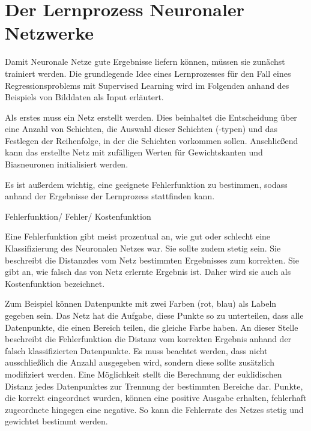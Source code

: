\section{Der Lernprozess Neuronaler Netzwerke}
\label{section: Lernprozess}
Damit Neuronale Netze gute Ergebnisse liefern können, müssen sie zunächst trainiert werden. Die grundlegende Idee eines Lernprozesses für den Fall eines Regressionsproblems mit Supervised Learning wird im Folgenden anhand des Beispiels von Bilddaten als Input erläutert. 

Als erstes muss ein Netz erstellt werden. Dies beinhaltet die Entscheidung über eine Anzahl von Schichten, die Auswahl dieser Schichten (-typen) und das Festlegen der Reihenfolge, in der die Schichten vorkommen sollen. Anschließend kann das erstellte Netz mit zufälligen Werten für Gewichtskanten und Biasneuronen initialisiert werden. \cite{} 

Es ist außerdem wichtig, eine geeignete Fehlerfunktion zu bestimmen, sodass anhand der Ergebnisse der Lernprozess stattfinden kann. 

\begin{definition}
	Fehlerfunktion/ Fehler/ Kostenfunktion
	
	Eine Fehlerfunktion gibt meist prozentual an, wie gut oder schlecht eine Klassifizierung des Neuronalen Netzes war. Sie sollte zudem stetig sein. \cite{}  Sie beschreibt die \glqq Distanz\grqq des vom Netz bestimmten Ergebnisses zum korrekten. Sie gibt an, wie falsch das von Netz erlernte Ergebnis ist. Daher wird sie auch als Kostenfunktion bezeichnet. \cite{Basics Kostenfunktion}
\end{definition}


Zum Beispiel können Datenpunkte mit zwei Farben (rot, blau) als Labeln gegeben sein. Das Netz hat die Aufgabe, diese Punkte so zu unterteilen, dass alle Datenpunkte, die einen Bereich teilen, die gleiche Farbe haben. An dieser Stelle beschreibt die Fehlerfunktion die Distanz vom korrekten Ergebnis anhand der falsch klassifizierten Datenpunkte. Es muss beachtet werden, dass nicht ausschließlich die Anzahl ausgegeben wird, sondern diese sollte zusätzlich modifiziert werden. Eine Möglichkeit stellt die Berechnung der euklidischen Distanz jedes Datenpunktes zur Trennung der bestimmten Bereiche dar. Punkte, die korrekt eingeordnet wurden, können eine positive Ausgabe erhalten, fehlerhaft zugeordnete hingegen eine negative. So kann die Fehlerrate des Netzes stetig und gewichtet bestimmt werden.


